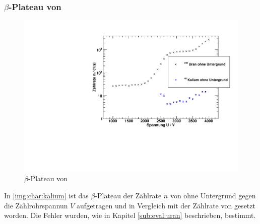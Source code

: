 \subsubsection{$\beta$-Plateau von \kalium}
\begin{figure}[H]
\begin{center}
  \includegraphics[width=15cm]{../img/Kalium40_Charakteristik.pdf}
  \caption[$\beta$-Plateau mit \samarium]{$\beta$-Plateau von \kalium}
  \label{img:char:kalium}
\end{center}
\end{figure}
In \autoref{img:char:kalium} ist das $\beta$-Plateau der Zählrate $n$ von \kalium ohne Untergrund gegen die Zählrohrspannun $V$ aufgetragen 
und in Vergleich mit der Zählrate von \uran gesetzt worden. Die Fehler wurden, wie in Kapitel \ref{sub:eval:uran} beschrieben, bestimmt.


